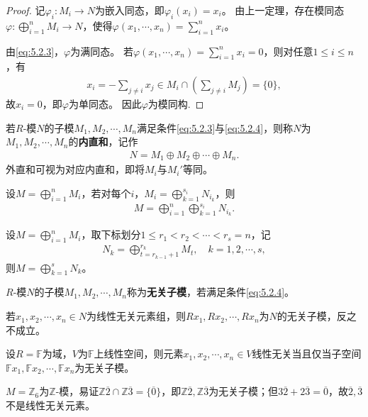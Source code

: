 \documentclass[../../main.tex]{subfiles}%
\begin{document}
\begin{proof}
记$\varphi_i\colon M_i\to N$为嵌入同态，即$\varphi_i(x_i)=x_i$。
由上一定理，存在模同态$\varphi\colon \bigoplus\limits_{i=1}^n M_i\to N$，使得$\varphi(x_1,\cdots,x_n)=\sum\limits_{i=1}^n x_i$。

由\eqref{eq:5.2.3}，$\varphi$为满同态。
若$\varphi(x_1,\cdots,x_n)=\sum\limits_{i=1}^n x_i=0$，则对任意$1\leqslant i\leqslant n$，有
\begin{align*}
x_i=-\sum\limits_{j\neq i}x_j\in M_i\cap\left(\sum\limits_{j\neq i}M_j\right)=\{0\},
\end{align*}
故$x_i=0$，即$\varphi$为单同态。
因此$\varphi$为模同构.
\end{proof}

\begin{definition}
若$R$-模$N$的子模$M_1,M_2,\cdots,M_n$满足条件\eqref{eq:5.2.3}与\eqref{eq:5.2.4}，则称$N$为$M_1,M_2,\cdots,M_n$的\textbf{内直和}，记作
\begin{align*}
N=M_1\oplus M_2\oplus\cdots\oplus M_n.
\end{align*}
外直和可视为对应内直和，即将$M_i$与$M_i'$等同。
\end{definition}

\begin{proposition}
设$M=\bigoplus\limits_{i=1}^n M_i$，若对每个$i$，$M_i=\bigoplus\limits_{k=1}^{s_i} N_{i_k}$，则
\begin{align*}
M=\bigoplus\limits_{i=1}^n\bigoplus\limits_{k=1}^{s_i} N_{i_k}.
\end{align*}
\end{proposition}

\begin{proposition}
设$M=\bigoplus\limits_{i=1}^n M_i$，取下标划分$1\leqslant r_1<r_2<\cdots<r_s=n$，记
\begin{align*}
N_k=\bigoplus\limits_{t=r_{k-1}+1}^{r_k} M_t,\quad k=1,2,\cdots,s,
\end{align*}
则$M=\bigoplus\limits_{k=1}^s N_k$。
\end{proposition}

\begin{definition}
$R$-模$N$的子模$M_1,M_2,\cdots,M_n$称为\textbf{无关子模}，若满足条件\eqref{eq:5.2.4}。
\end{definition}

\begin{remark}
若$x_1,x_2,\cdots,x_n\in N$为线性无关元素组，则$Rx_1,Rx_2,\cdots,Rx_n$为$N$的无关子模，反之不成立。
\end{remark}

\begin{example}
设$R=\mathbb{F}$为域，$V$为$\mathbb{F}$上线性空间，则元素$x_1,x_2,\cdots,x_n\in V$线性无关当且仅当子空间$\mathbb{F}x_1,\mathbb{F}x_2,\cdots,\mathbb{F}x_n$为无关子模。
\end{example}

\begin{example}
$M=\mathbb{Z}_6$为$\mathbb{Z}$-模，易证$\mathbb{Z}\overline{2}\cap\mathbb{Z}\overline{3}=\{\overline{0}\}$，即$\mathbb{Z}\overline{2},\mathbb{Z}\overline{3}$为无关子模；但$3\overline{2}+2\overline{3}=\overline{0}$，故$\overline{2},\overline{3}$不是线性无关元素。
\end{example}
\end{document}

